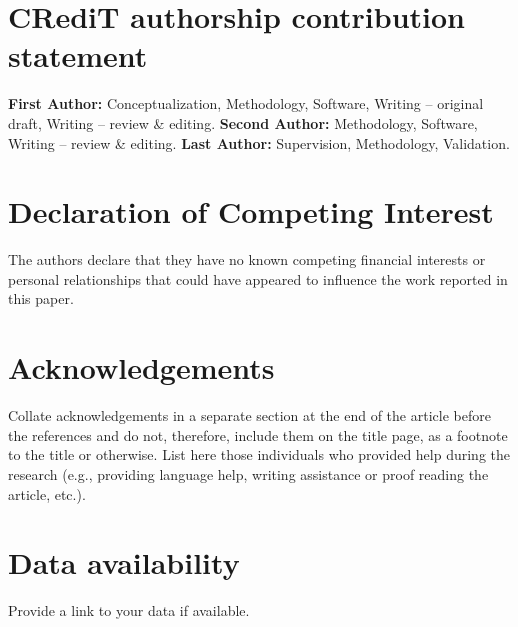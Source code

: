 \documentclass[review]{elsarticle}
\begin{document}
\section*{CRediT authorship contribution statement}
\textbf{First Author:} Conceptualization, Methodology, Software, Writing – original draft, Writing – review \& editing. \textbf{Second Author:} Methodology, Software, Writing – review \& editing. \textbf{Last Author:} Supervision, Methodology, Validation.
\begin{comment}
For transparency, we require corresponding authors to provide co-author contributions to the manuscript using the relevant CRediT roles. The CRediT taxonomy includes 14 different roles describing each contributor’s specific contribution to the scholarly output. The roles are: Conceptualization; Data curation; Formal analysis; Funding acquisition; Investigation; Methodology; Project administration; Resources; Software; Supervision; Validation; Visualization; Roles/Writing - original draft; and Writing - review & editing. Note that not all roles may apply to every manuscript, and authors may have contributed through multiple roles.
\end{comment}


\section*{Declaration of Competing Interest}
The authors declare that they have no known competing financial interests or personal relationships that could have appeared to influence the work reported in this paper.

\section*{Acknowledgements}
Collate acknowledgements in a separate section at the end of the article before the references and do not, therefore, include them on the title page, as a footnote to the title or otherwise. List here those individuals who provided help during the research (e.g., providing language help, writing assistance or proof reading the article, etc.).

\section*{Data availability}
Provide a link to your data if available.


\end{document}
